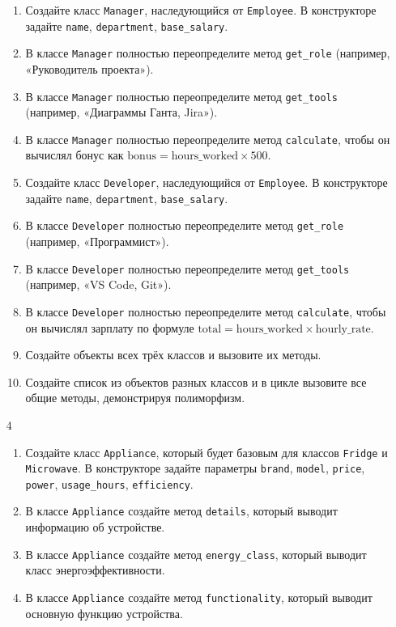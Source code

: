 \begin{enumerate}
\begin{enumerate}[leftmargin=*]
    \item Создайте класс \texttt{Manager}, наследующийся от \texttt{Employee}. В конструкторе задайте \texttt{name}, \texttt{department}, \texttt{base\_salary}.
    \item В классе \texttt{Manager} полностью переопределите метод \texttt{get\_role} (например, «Руководитель проекта»).
    \item В классе \texttt{Manager} полностью переопределите метод \texttt{get\_tools} (например, «Диаграммы Ганта, Jira»).
    \item В классе \texttt{Manager} полностью переопределите метод \texttt{calculate}, чтобы он вычислял бонус как \( \text{bonus} = \text{hours\_worked} \times 500 \).
    \item Создайте класс \texttt{Developer}, наследующийся от \texttt{Employee}. В конструкторе задайте \texttt{name}, \texttt{department}, \texttt{base\_salary}.
    \item В классе \texttt{Developer} полностью переопределите метод \texttt{get\_role} (например, «Программист»).
    \item В классе \texttt{Developer} полностью переопределите метод \texttt{get\_tools} (например, «VS Code, Git»).
    \item В классе \texttt{Developer} полностью переопределите метод \texttt{calculate}, чтобы он вычислял зарплату по формуле \( \text{total} = \text{hours\_worked} \times \text{hourly\_rate} \).
    \item Создайте объекты всех трёх классов и вызовите их методы.
    \item Создайте список из объектов разных классов и в цикле вызовите все общие методы, демонстрируя полиморфизм.
\end{enumerate}
\item[4]
\begin{enumerate}[leftmargin=*]
    \item Создайте класс \texttt{Appliance}, который будет базовым для классов \texttt{Fridge} и \texttt{Microwave}. В конструкторе задайте параметры \texttt{brand}, \texttt{model}, \texttt{price}, \texttt{power}, \texttt{usage\_hours}, \texttt{efficiency}.
    \item В классе \texttt{Appliance} создайте метод \texttt{details}, который выводит информацию об устройстве.
    \item В классе \texttt{Appliance} создайте метод \texttt{energy\_class}, который выводит класс энергоэффективности.
    \item В классе \texttt{Appliance} создайте метод \texttt{functionality}, который выводит основную функцию устройства.

\end{enumerate}
\end{enumerate}
